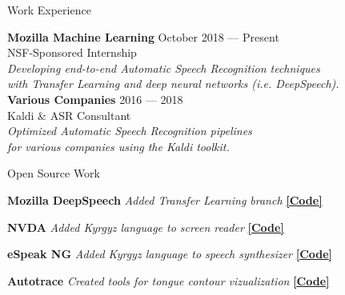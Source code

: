 \documentclass{resume} %
\begin{document}

\vspace{.25cm}

\begin{rSection}{Work Experience}
  
{\bf Mozilla Machine Learning} \hfill {October 2018 --- Present} \\ 
NSF-Sponsored Internship \hfill {} \\
\textit{Developing end-to-end Automatic Speech Recognition techniques} \hfill {} \\
\textit{with Transfer Learning and deep neural networks (i.e. DeepSpeech).} \hfill {} \\
  
{\bf Various Companies} \hfill {2016 --- 2018} \\ 
Kaldi \& ASR Consultant  \hfill {} \\
\textit{Optimized Automatic Speech Recognition pipelines}   \hfill {} \\
\textit{for various companies using the Kaldi toolkit.}   \hfill {} \\

\end{rSection}



\vspace{.25cm}

\begin{rSection}{Open Source Work}

  {\textbf{Mozilla DeepSpeech}} {\hfill \textit{Added Transfer Learning branch} {\hspace{2.5cm} \href{https://github.com/mozilla/DeepSpeech/tree/transfer-learning}{\textbf{[Code]}}}} \\
\vspace{-.25cm}

{\textbf{NVDA}} {\hfill \textit{Added Kyrgyz language to screen reader} {\hspace{2.5cm} \href{https://github.com/JRMeyer/nvda}{\textbf{[Code]}}}} \\
\vspace{-.25cm}

{\textbf{eSpeak NG}} {\hfill \textit{Added Kyrgyz language to speech synthesizer} {\hspace{2.5cm} \href{https://github.com/rhdunn/espeak/commits?author=JRMeyer}{\textbf{[Code]}}}}\\
\vspace{-.25cm}

{\textbf{Autotrace}} {\hfill \textit{Created tools for tongue contour vizualization} {\hspace{2.5cm} \href{https://github.com/JRMeyer/Autotrace}{\textbf{[Code]}}}} \\

\end{rSection}
\end{document}
